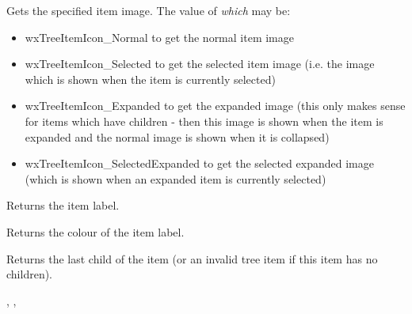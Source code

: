 
Gets the specified item image. The value of {\it which} may be:

\begin{itemize}\itemsep=0pt
\item{wxTreeItemIcon\_Normal} to get the normal item image
\item{wxTreeItemIcon\_Selected} to get the selected item image (i.e. the image
which is shown when the item is currently selected)
\item{wxTreeItemIcon\_Expanded} to get the expanded image (this only
makes sense for items which have children - then this image is shown when the
item is expanded and the normal image is shown when it is collapsed)
\item{wxTreeItemIcon\_SelectedExpanded} to get the selected expanded image
(which is shown when an expanded item is currently selected)
\end{itemize}


\label{wxtreectrlgetitemtext}


Returns the item label.


\label{wxtreectrlgetitemtextcolour}


Returns the colour of the item label.


\label{wxtreectrlgetlastchild}


Returns the last child of the item (or an invalid tree item if this item has no children).


,
,


\label{wxtreectrlgetnextchild}


